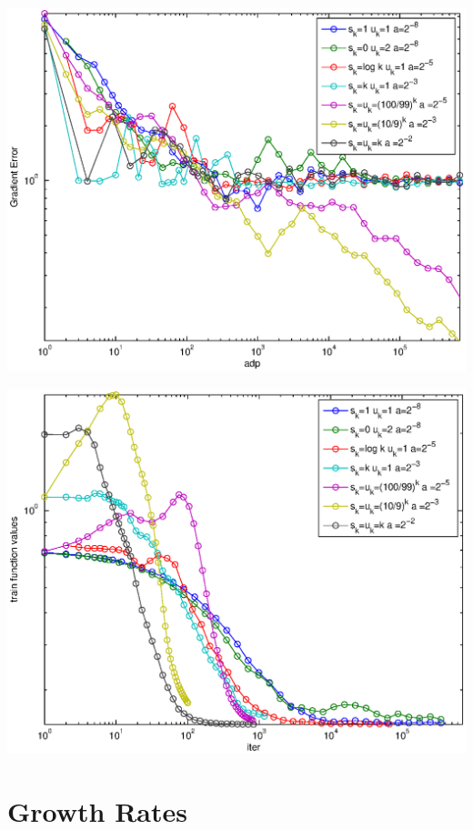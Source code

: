 \documentclass[12pt]{article}
\begin{document}
	
	\begin{center}
	\includegraphics{Figures/LRerror.eps}    
	\end{center}
	
	\begin{center}
	\includegraphics{Figures/LRiter.eps}    
	\end{center}
	
	\newpage
	
	\section{Growth Rates}
	
\end{document}
